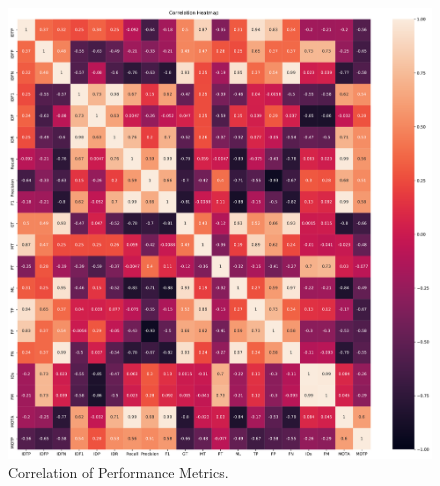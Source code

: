 \begin{figure}[!htbp]
  \centering
  \includegraphics[width=1.0\linewidth]{img/correlation.pdf}
  \caption[Correlation of Performance Metrics]
  {
  Correlation of Performance Metrics.
  }
  \label{fig:correlation}
\end{figure}